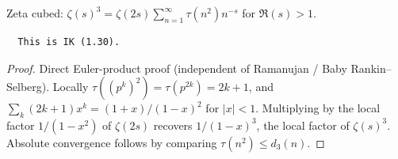 \begin{theorem}
\label{zeta_pow_three_eq}
\leanok
Zeta cubed: $\zeta(s)^3 = \zeta(2s) \sum_{n=1}^{\infty}\tau(n^2) n^{-s}$ for $\Re(s) > 1$.
  \begin{verbatim}
  This is IK (1.30).
  \end{verbatim}
\end{theorem}
\begin{proof}
\leanok
Direct Euler-product proof (independent of Ramanujan / Baby Rankin--Selberg).
  Locally $\tau((p^k)^2)=\tau(p^{2k})=2k+1$, and $\sum_k(2k+1)x^k=(1+x)/(1-x)^2$ for $|x|<1$.
  Multiplying by the local factor $1/(1-x^2)$ of $\zeta(2s)$ recovers $1/(1-x)^3$, the local
  factor of $\zeta(s)^3$. Absolute convergence follows by comparing $\tau(n^2)\le d_3(n)$.
\end{proof}
